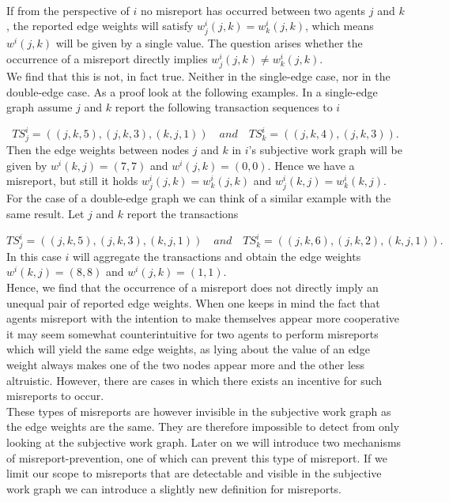 \begin{remark}[]\ \\
\label{rem:Edge Weights (Misreport)}
\noindent{}If from the perspective of $i$ no misreport has occurred between two agents $j$ and $k$, the reported edge weights will satisfy $w_j^i(j,k)=w_k^i(j,k)$, which means $w^i(j,k)$ will be given by a single value. The question arises whether the occurrence of a misreport directly implies $w_j^i(j,k)\neq{}w_k^i(j,k)$. \vspace{1em}\\

\noindent{}We find that this is not, in fact true. Neither in the single-edge case, nor in the double-edge case. As a proof look at the following examples. In a single-edge graph assume $j$ and $k$ report the following transaction sequences to $i$

\[
TS_j^i=((j,k,5), (j,k,3), (k,j,1))\quad\textit{and}\quad{}TS_k^i=((j,k,4), (j,k,3)).
\]
\noindent{}Then the edge weights between nodes $j$ and $k$ in $i$'s subjective work graph will be given by $w^i(k,j)=(7,7)$ and $w^i(j,k)=(0,0)$. Hence we have a misreport, but still it holds $w_j^i(j,k)=w_k^i(j,k)$ and $w_j^i(k,j)=w_k^i(k,j)$.\vspace{1em}\\

\noindent{}For the case of a double-edge graph we can think of a similar example with the same result. Let $j$ and $k$ report the transactions

\[
TS_j^i=((j,k,5), (j,k,3), (k,j,1))\quad\textit{and}\quad{}TS_k^i=((j,k,6), (j,k,2), (k,j,1)).
\]
\noindent{}In this case $i$ will aggregate the transactions and obtain the edge weights $w^i(k,j)=(8,8)$ and $w^i(j,k)=(1,1)$.\vspace{1em}\\
\noindent{}Hence, we find that the occurrence of a misreport does not directly imply an unequal pair of reported edge weights. When one keeps in mind the fact that agents misreport with the intention to make themselves appear more cooperative it may seem somewhat counterintuitive for two agents to perform misreports which will yield the same edge weights, as lying about the value of an edge weight always makes one of the two nodes appear more and the other less altruistic. However, there are cases in which there exists an incentive for such misreports to occur.\vspace{1em}\\

\noindent{}These types of misreports are however invisible in the subjective work graph as the edge weights are the same. They are therefore impossible to detect from only looking at the subjective work graph. Later on we will introduce two mechanisms of misreport-prevention, one of which can prevent this type of misreport. If we limit our scope to misreports that are detectable and visible in the subjective work graph we can introduce a slightly new definition for misreports. \vspace{1em}\\ 
\end{remark}

